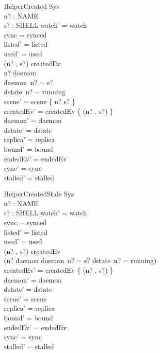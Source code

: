 \documentclass[a4paper,10pt,fleqn]{article}
\begin{document}
\begin{schema}{HelperCreated}
  \Delta Sys \\
  n? : NAME \\
  s? : SHELL
\where
  watch' = watch \\
  sync = synced \\
  listed' = listed \\
  used' = used \\
  (n? , s?) \in createdEv \\
  n? \in \dom daemon \\
  daemon~n? = s? \\
  dstate~n? = running \\
  scene' = scene \oplus \{ n? \mapsto s? \} \\
  createdEv' = createdEv \setminus \{ (n? , s?) \} \\
  daemon' = daemon \\
  dstate' = dstate \\
  replica' = replica \\
  bound' = bound \\
  endedEv' = endedEv \\
  sync' = sync \\
  stalled' = stalled
\end{schema}

\begin{schema}{HelperCreatedStale}
  \Delta Sys \\
  n? : NAME \\
  s? : SHELL
\where
  watch' = watch \\
  sync = synced \\
  listed' = listed \\
  used' = used \\
  (n? , s?) \in createdEv \\
  \lnot (n? \in \dom daemon \land daemon~n? = s?
    \land dstate~n? = running) \\
  createdEv' = createdEv \setminus \{ (n? , s?) \} \\
  daemon' = daemon \\
  dstate' = dstate \\
  scene' = scene \\
  replica' = replica \\
  bound' = bound \\
  endedEv' = endedEv \\
  sync' = sync \\
  stalled' = stalled
\end{schema}
\end{document}
